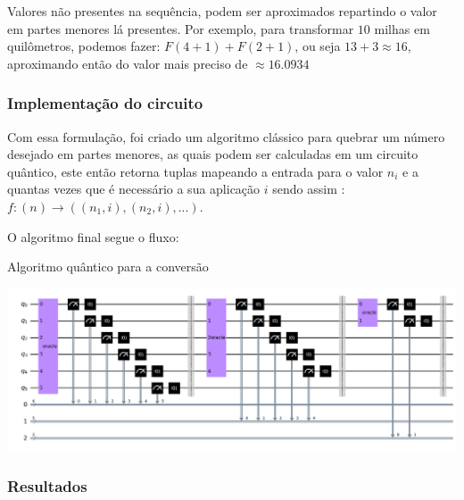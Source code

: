 \documentclass{article}
\begin{document}
Valores não presentes na sequência, podem ser aproximados repartindo o valor em partes menores lá presentes. Por exemplo, para transformar $10$ milhas em quilômetros, podemos fazer: $F(4+1) + F(2+1)$, ou seja $13 + 3 \approx 16$, aproximando então do valor mais preciso de $\approx 16.0934$


\subsubsection{Implementação do circuito}

Com essa formulação, foi criado um algoritmo clássico para quebrar um número desejado em partes menores, as quais podem ser calculadas em um circuito quântico, este então retorna tuplas mapeando a entrada para o valor $n_i$ e a quantas vezes que é necessário a sua aplicação $i$ sendo assim : $ f: (n) \to ((n_1, i), (n_2, i), ...)$.

O algoritmo final segue o fluxo:

\begin{algorithm}
	\begin{algorithmic}
		\EndFor
		
	\end{algorithmic}
	\caption{Algoritmo quântico para a conversão}
	\label{alg:miles-to-km-quantum-algortihm}
\end{algorithm}

\begin{center}
	\includegraphics[scale=0.15]{number_breakdown_circuit.png}
	\label{fig:miles-km-circuit}
\end{center}

\subsubsection{Resultados}
\end{document}
